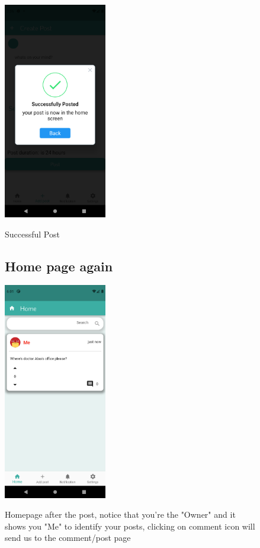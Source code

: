 \documentclass[12pt]{article}
\begin{document}
\begin{figure}[h!]

{\includegraphics[width=0.4\textwidth]{./Screenshots/12.PNG}}
  \caption{Successful Post}
  \end{figure}
  \begin{figure}[h!]
  \subsection*{Home page again}
{\includegraphics[width=0.4\textwidth]{./Screenshots/13.PNG}}
  \caption{Homepage after the post, notice that you're the "Owner" and it shows you "Me" to identify your posts, clicking on comment icon will send us to the comment/post page}
  \end{figure}
\end{document}
